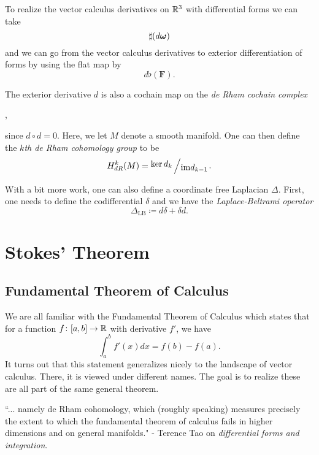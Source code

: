 \noindent To realize the vector calculus derivatives on $\mathbb{R}^3$ with differential forms we can take
\[
\sharp(d\boldsymbol{\omega})
\]
and we can go from the vector calculus derivatives to exterior differentiation of forms by using the flat map by
\[
d \flat(\mathbf{F}).
\]



\begin{remark}
The exterior derivative $d$ is also a cochain map on the \emph{de Rham cochain complex} 
\begin{center}
,
\end{center}
since $d\circ d = 0$. Here, we let $M$ denote a smooth manifold. One can then define the \emph{$k$th de Rham cohomology group} to be
\[
H^k_{dR}(M) = \bigslant{\ker d_k}{\textrm{im} d_{k-1}}. 
\]
\end{remark}

\begin{remark}
With a bit more work, one can also define a coordinate free Laplacian $\Delta$.  First, one needs to define the codifferential $\delta$ and we have the \emph{Laplace-Beltrami operator}
\[
\Delta_{\textrm{LB}}\coloneqq d\delta + \delta d.
\]
\end{remark}

\section{Stokes' Theorem}

\subsection{Fundamental Theorem of Calculus}

We are all familiar with the Fundamental Theorem of Calculus which states that for a function $f\colon [a,b] \to \mathbb{R}$ with derivative $f'$, we have
\[
\int_a^b f'(x)dx = f(b)-f(a).
\]
It turns out that this statement generalizes nicely to the landscape of vector calculus.  There, it is viewed under different names.  The goal is to realize these are all part of the same general theorem.

\begin{remark}
``... namely de Rham cohomology, which (roughly speaking) measures precisely the extent to which the fundamental theorem of calculus fails in higher dimensions and on general manifolds." - Terence Tao on \emph{differential forms and integration}.
\end{remark}

